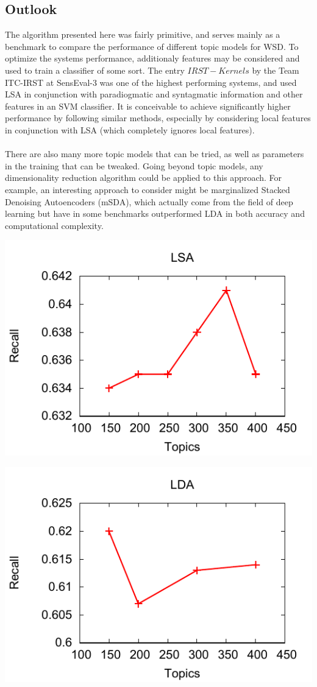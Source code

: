 \subsection{Outlook}
The algorithm presented here was fairly primitive, and serves mainly as a benchmark to compare the performance of different topic models for WSD. To optimize the systems performance, additionaly features may be considered and used to train a classifier of some sort. The entry $IRST-Kernels$ by the Team ITC-IRST at SensEval-3 was one of the highest performing systems, and used LSA in conjunction with paradiogmatic and syntagmatic information and other features in an SVM classifier\cite{senseval3paper}. It is conceivable to achieve significantly higher performance by following similar methods, especially by considering local features in conjunction with LSA (which completely ignores local features).\\\\
There are also many more topic models that can be tried, as well as parameters in the training that can be tweaked. Going beyond topic models, any dimensionality reduction algorithm could be applied to this approach. For example, an interesting approach to consider might be marginalized Stacked Denoising Autoencoders (mSDA), which actually come from the field of deep learning but have in some benchmarks outperformed LDA in both accuracy and computational complexity.


\includegraphics{plot/lsa_lines.pdf}

\includegraphics{plot/lda_lines.pdf}
